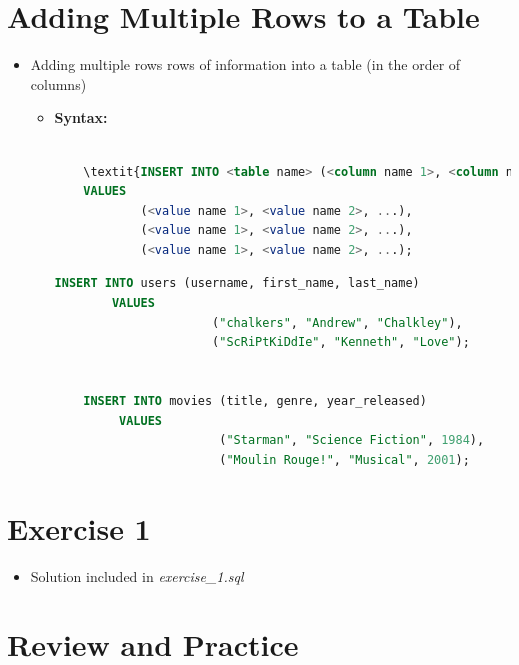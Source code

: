 \documentclass[12pt]{article}
\begin{document}
\section{Adding Multiple Rows to a Table}

\bigskip

\begin{itemize}
    \item Adding multiple rows rows of information into a table (in the order of columns)
    \begin{itemize}
        \item \textbf{Syntax:}

        \bigskip

    \begin{lstlisting}[language=SQL]

    \textit{INSERT INTO <table name> (<column name 1>, <column name 2>, ...)}
    VALUES
            (<value name 1>, <value name 2>, ...),
            (<value name 1>, <value name 2>, ...),
            (<value name 1>, <value name 2>, ...);
    \end{lstlisting}

    \begin{lstlisting}[language=SQL]
    INSERT INTO users (username, first_name, last_name)
        VALUES
                      ("chalkers", "Andrew", "Chalkley"),
                      ("ScRiPtKiDdIe", "Kenneth", "Love");


    INSERT INTO movies (title, genre, year_released)
         VALUES
                       ("Starman", "Science Fiction", 1984),
                       ("Moulin Rouge!", "Musical", 2001);
    \end{lstlisting}

    \end{itemize}
\end{itemize}

\bigskip

\section{Exercise 1}

\bigskip

\begin{itemize}
    \item Solution included in \textit{exercise\_1.sql}
\end{itemize}

\bigskip

\section{Review and Practice}
\end{document}
